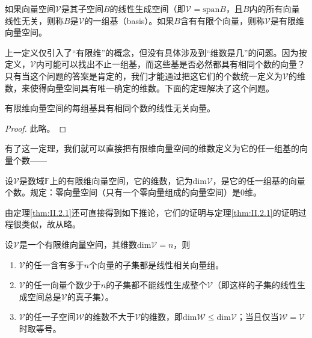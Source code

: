 \documentclass[../main.tex]{subfiles}
\begin{document}
\begin{definition}[基]\label{def:II.2.5}
    如果向量空间$\mathcal{V}$是其子空间$B$的线性生成空间（即$\mathcal{V}=\mathrm{span}B$，且$B$内的所有向量线性无关，则称$B$是$\mathcal{V}$的一组基（basis）。如果$B$含有有限个向量，则称$\mathcal{V}$是有限维向量空间。
\end{definition}

上一定义仅引入了“有限维”的概念，但没有具体涉及到“维数是几”的问题。因为按定义，$\mathcal{V}$内可能可以找出不止一组基，而这些基是否必然都具有相同个数的向量？只有当这个问题的答案是肯定的，我们才能通过把这它们的个数统一定义为$\mathcal{V}$的维数，来使得向量空间具有唯一确定的维数。下面的定理解决了这个问题。

\begin{theorem}\label{thm:II.2.1}
    有限维向量空间的每组基具有相同个数的线性无关向量。
\end{theorem}
\begin{proof}
    此略\cite[“(3)的证明”，p.~171]{周胜林2012线性代数}\cite[\S 2.3,Theorem 4,p.~44]{Hoffman1971}。
\end{proof}

有了这一定理，我们就可以直接把有限维向量空间的维数定义为它的任一组基的向量个数——

\begin{definition}[有限维向量空间的维数]\label{def:II.2.6}
    设$\mathcal{V}$是数域$\mathbb{F}$上的有限维向量空间，它的维数，记为$\mathrm{dim}\mathcal{V}$，是它的任一组基的向量个数。规定：零向量空间（只有一个零向量组成的向量空间）是0维。
\end{definition}

由定理\ref{thm:II.2.1}还可直接得到如下推论，它们的证明与定理\ref{thm:II.2.1}的证明过程很类似，故从略。

\begin{corollary}
    设$\mathcal{V}$是一个有限维向量空间，其维数$\mathrm{dim}\mathcal{V}=n$，则
    \begin{enumerate}
        \item $\mathcal{V}$的任一含有多于$n$个向量的子集都是线性相关向量组\cite[“(3)的证明”，p.~171]{周胜林2012线性代数}。
        \item $\mathcal{V}$的任一向量个数少于$n$的子集都不能线性生成整个$\mathcal{V}$（即这样的子集的线性生成空间总是$\mathcal{V}$的真子集）。
        \item $\mathcal{V}$的任一子空间$\mathcal{W}$的维数不大于$\mathcal{V}$的维数，即$\mathrm{dim}\mathcal{W}\leq\mathrm{dim}\mathcal{V}$；当且仅当$\mathcal{W}=\mathcal{V}$时取等号。
    \end{enumerate}
\end{corollary}
\end{document}
